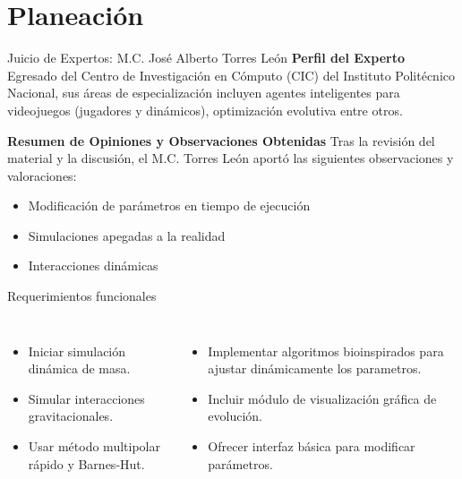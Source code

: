 \section{Planeación}

\begin{frame}{Juicio de Expertos: M.C. José Alberto Torres León}
  \textbf{Perfil del Experto}
  \RaggedRight
  \scriptsize
  Egresado del Centro de Investigación en Cómputo (CIC) del Instituto Politécnico Nacional, sus áreas de especialización
  incluyen agentes inteligentes para videojuegos (jugadores y dinámicos), optimización evolutiva entre otros.

  \bigskip

  \textbf{Resumen de Opiniones y Observaciones Obtenidas}
  \RaggedRight
  \scriptsize
  Tras la revisión del material y la discusión, el M.C. Torres León aportó las siguientes observaciones y valoraciones:
  \begin{itemize}
    \item Modificación de parámetros en tiempo de ejecución
    \item Simulaciones apegadas a la realidad
    \item Interacciones dinámicas
  \end{itemize}
\end{frame}

\begin{frame}{Requerimientos funcionales}
  \begin{columns}[T]
      \begin{itemize}
        \item Iniciar simulación dinámica de masa.
        \item Simular interacciones gravitacionales.
        \item Usar método multipolar rápido y Barnes-Hut.
      \end{itemize}
      \begin{itemize}
        \item Implementar algoritmos bioinspirados para ajustar dinámicamente los parametros.
        \item Incluir módulo de visualización gráfica de evolución.
        \item Ofrecer interfaz básica para modificar parámetros.
      \end{itemize}
  \end{columns}
\end{frame}

